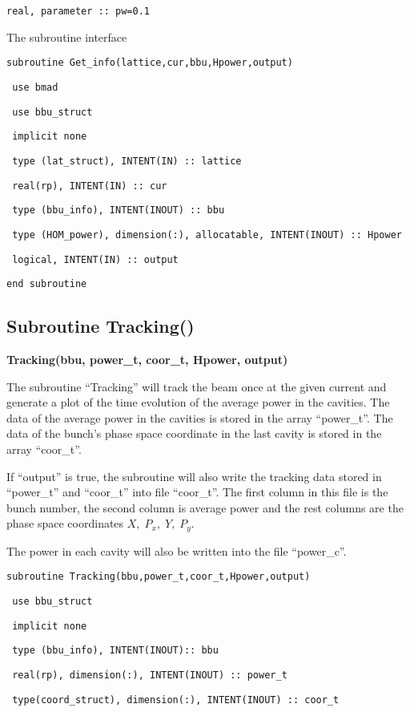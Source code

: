 \documentclass[12pt]{article}
\begin{document}
\texttt{real, parameter :: pw=0.1}

The subroutine interface 

\texttt{subroutine Get\_info(lattice,cur,bbu,Hpower,output)}

\texttt{    use bmad}

\texttt{    use bbu\_struct}

\texttt{    implicit none}

\texttt{    type (lat\_struct), INTENT(IN)    :: lattice}

\texttt{    real(rp),           INTENT(IN)    :: cur}

\texttt{    type (bbu\_info),    INTENT(INOUT) :: bbu}

\texttt{    type (HOM\_power), dimension(:), allocatable, INTENT(INOUT) :: Hpower}

\texttt{    logical, INTENT(IN) :: output}

\texttt{end subroutine}

\subsection{Subroutine Tracking()}
{\bf Tracking(bbu, power\_t, coor\_t, Hpower, output)}

The subroutine ``Tracking'' will track the beam once at the given current and generate a plot of the time evolution of the average power in the cavities.
The data of the average power in the cavities is stored in the array ``power\_t''. The data of the bunch's phase space coordinate in the last cavity is stored in the array ``coor\_t''.

If ``output'' is true, the subroutine will also write the tracking data stored in ``power\_t'' and ``coor\_t'' into file ``coor\_t''. The first column in this file is the bunch number, the second column is average power and the rest columns are the phase space coordinates $X,\;P_x,\;Y,\;P_y$.

The power in each cavity will also be written into the file ``power\_c''.
 
\texttt{subroutine Tracking(bbu,power\_t,coor\_t,Hpower,output)}

\texttt{    use bbu\_struct}

\texttt{    implicit none}

\texttt{    type (bbu\_info), INTENT(INOUT):: bbu}

\texttt{    real(rp), dimension(:), INTENT(INOUT) :: power\_t}

\texttt{    type(coord\_struct), dimension(:), INTENT(INOUT) :: coor\_t}  
\end{document}
